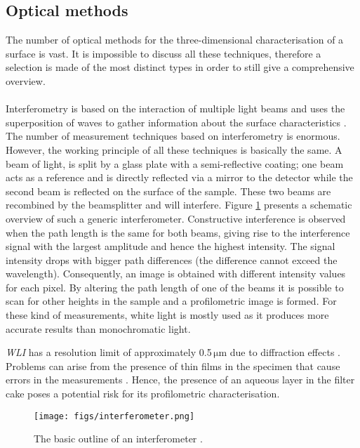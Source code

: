 \subsection{Optical methods}
The number of optical methods for the three-dimensional characterisation of a surface is vast. It is impossible to discuss all these techniques, therefore a selection is made of the most distinct types in order to still give a comprehensive overview. \\ \\
Interferometry is based on the interaction of multiple light beams and uses the superposition of waves to gather information about the surface characteristics \citep{Hariharan}. The number of measurement techniques based on interferometry is enormous. However, the working principle of all these techniques is basically the same. A beam of light, is split by a glass plate with a semi-reflective coating; one beam acts as a reference and is directly reflected via a mirror to the detector while the second beam is reflected on the surface of the sample. %
These two beams are recombined by the beamsplitter and will interfere. Figure \ref{interferometer} presents a schematic overview of such a generic interferometer. Constructive interference is observed when the path length is the same for both beams, giving rise to the interference signal with the largest amplitude and hence the highest intensity. The signal intensity drops with bigger path differences (the difference cannot exceed the wavelength). Consequently, an image is obtained with different intensity values for each pixel. By altering the path length of one of the beams it is possible to scan for other heights in the sample and a profilometric image is formed. For these kind of measurements, white light is mostly used as it produces more accurate results than monochromatic light. \par
\emph{\Gls{WLI}} has a resolution limit of approximately 0.5\,$\mathrm{\mu m}$ due to diffraction effects \citep{Conroy2006,Hariharan}. 
Problems can arise from the presence of thin films in the specimen that cause errors in the measurements \citep{Conroy2006}. Hence, the presence of an aqueous layer in the filter cake poses a potential risk for its profilometric characterisation. \par
\begin{figure}[H]
\begin{center}
\hspace{-1.5cm}
\texttt{[image: figs/interferometer.png]}
\caption{The basic outline of an interferometer \citep{Search1997}.} 
\label{interferometer}
\end{center}
\end{figure}
